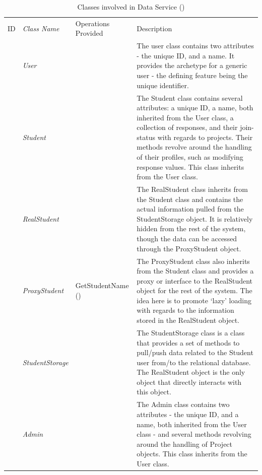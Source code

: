 \documentclass[12pt,letterpaper]{article}
\begin{document}
\begin{table}[H]
\caption{Classes involved in Data Service ()} 
\begin{tabu} to 
	\tableheader{}ID & Class Name & Operations Provided & Description \\
	 & User & & The user class contains two attributes - the unique ID, and a name. It provides the archetype for a generic user - the defining feature being the unique identifier.\\
	 & Student &  & The Student class contains several attributes: a unique ID, a name, both inherited from the User class, a collection of responses, and their join-status with regards to projects. Their methods revolve around the handling of their profiles, such as modifying response values. This class inherits from the User class. \\
	 & RealStudent & & The RealStudent class inherits from the Student class and contains the actual information pulled from the StudentStorage object. It is relatively hidden from the rest of the system, though the data can be accessed through the ProxyStudent object.\\
	 & ProxyStudent & GetStudentName () & The ProxyStudent class also inherits from the Student class and provides a proxy or interface to the RealStudent object for the rest of the system. The idea here is to promote `lazy' loading with regards to the information stored in the RealStudent object.\\
	 & StudentStorage & & The StudentStorage class is a class that provides a set of methods to pull/push data related to the Student user from/to the relational database. The RealStudent object is the only object that directly interacts with this object.\\
	 & Admin & & The Admin class contains two attributes - the unique ID, and a name, both inherited from the User class - and several methods revolving around the handling of Project objects. This class inherits from the User class. \\
\end{tabu}
\end{table}
\end{document}

